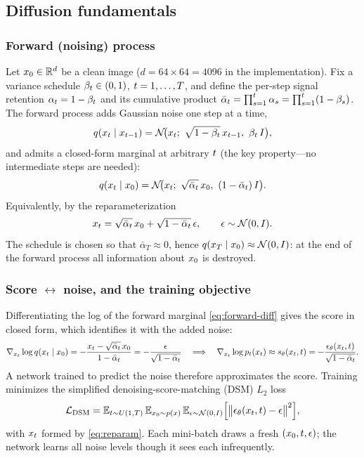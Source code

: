 \subsection{Diffusion fundamentals}\label{sec:diff-fund}

\subsubsection{Forward (noising) process}
Let $x_{0}\in\mathbb{R}^{d}$ be a clean image ($d=64\times64=4096$ in the
implementation). Fix a variance schedule $\beta_{t}\in(0,1)$, $t=1,\dots,T$, and
define the per-step signal retention $\alpha_{t}=1-\beta_{t}$ and its cumulative product
$\bar{\alpha}_{t}=\prod_{s=1}^{t}\alpha_{s}=\prod_{s=1}^{t}(1-\beta_{s})$. The forward
process adds Gaussian noise one step at a time,
\begin{equation}
q(\xt\mid x_{\dt-1})=\Gauss\!\big(\xt;\ \sqrt{1-\bsched}\,x_{\dt-1},\ \bsched\,I\big),
\label{eq:forward-step}
\end{equation}
and admits a closed-form marginal at arbitrary $t$ (the key property---no
intermediate steps are needed):
\begin{equation}
q(\xt\mid\xz)=\Gauss\!\big(\xt;\ \sqrt{\abar}\,\xz,\ (1-\abar)\,I\big).
\label{eq:forward-diff}
\end{equation}
Equivalently, by the reparameterization
\begin{equation}
x_{t}=\sqrt{\bar{\alpha}_{t}}\,x_{0}+\sqrt{1-\bar{\alpha}_{t}}\,\epsilon,\qquad \epsilon\sim\mathcal{N}(0,I).
\label{eq:reparam}
\end{equation}
The schedule is chosen so that $\bar\alpha_{T}\approx0$, hence
$q(x_{T}\mid x_{0})\approx\mathcal{N}(0,I)$: at the end of the forward process all
information about $x_{0}$ is destroyed.

\subsubsection{Score $\leftrightarrow$ noise, and the training objective}
Differentiating the log of the forward marginal \eqref{eq:forward-diff} gives the
score in closed form, which identifies it with the added noise:
\begin{equation}
\nabla_{x_{t}}\log q(x_{t}\mid x_{0})
   =-\frac{x_{t}-\sqrt{\bar{\alpha}_{t}}\,x_{0}}{1-\bar{\alpha}_{t}}
   =-\frac{\epsilon}{\sqrt{1-\bar{\alpha}_{t}}}
\quad\Longrightarrow\quad
\nabla_{x_{t}}\log p_{t}(x_{t})\approx s_{\theta}(x_{t},t)=-\frac{\epsilon_{\theta}(x_{t},t)}{\sqrt{1-\bar{\alpha}_{t}}}.
\label{eq:score-noise}
\end{equation}
A network trained to predict the noise therefore approximates the score. Training
minimizes the simplified denoising-score-matching (DSM) $L_{2}$ loss
\begin{equation}
\mathcal{L}_{\mathrm{DSM}}
  =\mathbb{E}_{t\sim U(1,T)}\,\mathbb{E}_{x_{0}\sim p(x)}\,\mathbb{E}_{\epsilon\sim\mathcal{N}(0,I)}
   \Big[\big\lVert\epsilon_{\theta}(x_{t},t)-\epsilon\big\rVert^{2}\Big],
\label{eq:dsm}
\end{equation}
with $x_{t}$ formed by \eqref{eq:reparam}. Each mini-batch draws a fresh
$(x_{0},t,\epsilon)$; the network learns all noise levels though it sees each
infrequently.

